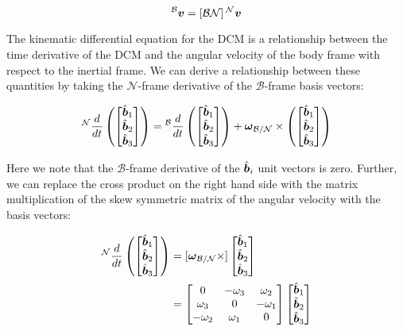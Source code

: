 \begin{equation}
   {}^\mathcal{B}\boldsymbol{v} = \left[\mathcal{BN}\right] {}^\mathcal{N}\boldsymbol{v}
\end{equation}

The kinematic differential equation for the DCM is a relationship between the time derivative of the DCM and the angular velocity of the body frame with respect to the inertial frame. We can derive a relationship between these quantities by taking the $\mathcal{N}$-frame derivative of the $\mathcal{B}$-frame basis vectors:

\begin{equation}
    {}^\mathcal{N}\frac{d}{dt}\left(
        \begin{bmatrix}
            \hat{\boldsymbol{b}}_1 \\ \hat{\boldsymbol{b}}_2 \\ \hat{\boldsymbol{b}}_3
        \end{bmatrix}
    \right) = {}^\mathcal{B}\frac{d}{dt}\left(
        \begin{bmatrix}
            \hat{\boldsymbol{b}}_1 \\ \hat{\boldsymbol{b}}_2 \\ \hat{\boldsymbol{b}}_3
        \end{bmatrix}
    \right) + \boldsymbol{\omega}_\mathcal{B/N} \times \left(
        \begin{bmatrix}
            \hat{\boldsymbol{b}}_1 \\ \hat{\boldsymbol{b}}_2 \\ \hat{\boldsymbol{b}}_3
        \end{bmatrix}
    \right)
\end{equation}

Here we note that the $\mathcal{B}$-frame derivative of the $\hat{\boldsymbol{b}}_i$ unit vectors is zero. Further, we can replace the cross product on the right hand side with the matrix multiplication of the skew symmetric matrix of the angular velocity with the basis vectors:

\begin{align*}
    {}^\mathcal{N}\frac{d}{dt}\left(
        \begin{bmatrix}
            \hat{\boldsymbol{b}}_1 \\ \hat{\boldsymbol{b}}_2 \\ \hat{\boldsymbol{b}}_3
        \end{bmatrix}
    \right) &= [\boldsymbol{\omega}_\mathcal{B/N}\times]
        \begin{bmatrix}
            \hat{\boldsymbol{b}}_1 \\ \hat{\boldsymbol{b}}_2 \\ \hat{\boldsymbol{b}}_3
        \end{bmatrix} \\
        &= \begin{bmatrix}
            0 & -\omega_3 & \omega_2 \\
            \omega_3 & 0 & -\omega_1 \\
            -\omega_2 & \omega_1 & 0 \\
        \end{bmatrix}
        \begin{bmatrix}
            \hat{\boldsymbol{b}}_1 \\ \hat{\boldsymbol{b}}_2 \\ \hat{\boldsymbol{b}}_3
        \end{bmatrix} \\
\end{align*}

